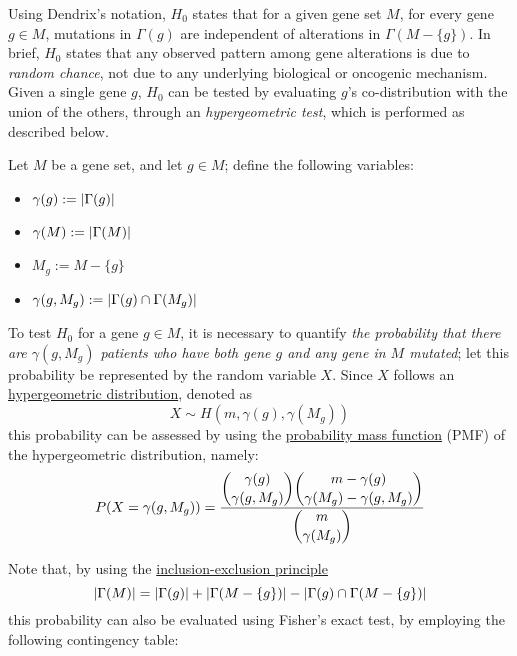 Using Dendrix's notation, $H_0$ states that for a given gene set $M$, for every gene $g \in M$, mutations in $\Gamma(g)$ are independent of alterations in $\Gamma(M - \{g\})$. In brief, $H_0$ states that any observed pattern among gene alterations is due to \textit{random chance}, not due to any underlying biological or oncogenic mechanism. Given a single gene $g$, $H_0$ can be tested by evaluating $g$'s co-distribution with the union of the others, through an \textit{hypergeometric test}, which is performed as described below.

\begin{definition}[Notation]
    Let $M$ be a gene set, and let $g \in M$; define the following variables:

    \begin{itemize}
        \item $\gamma(g) := \left|\Gamma(g)\right|$
        \item $\gamma(M) := \left|\Gamma(M)\right|$
        \item $M_g := M - \{g\}$
        \item $\gamma(g, M_g) := \left|\Gamma(g) \cap \Gamma(M_g)\right|$
    \end{itemize}
\end{definition}

To test $H_0$ for a gene $g \in M$, it is necessary to quantify \textit{the probability that there are $\gamma(g, M_g)$ patients who have both gene $g$ and any gene in $M$ mutated}; let this probability be represented by the random variable $X$. Since $X$ follows an \href{https://en.wikipedia.org/wiki/Hypergeometric_distribution}{hypergeometric distribution}, denoted as $$X \sim H(m, \gamma(g), \gamma(M_g))$$ this probability can be assessed by using the \href{https://en.wikipedia.org/wiki/Probability_mass_function}{probability mass function} (PMF) of the hypergeometric distribution, namely: $$P(X = \gamma(g, M_g)) = \dfrac{\dbinom{\gamma(g)}{\gamma(g, M_g)}\dbinom{m - \gamma(g)}{\gamma(M_g) - \gamma(g, M_g)}}{\dbinom{m}{\gamma(M_g)}}$$

Note that, by using the \href{https://en.wikipedia.org/wiki/Inclusion%E2%80%93exclusion_principle}{inclusion-exclusion principle} $$\left|\Gamma(M)\right| = \left|\Gamma(g)\right| + \left|\Gamma(M - \{g\})\right| - \left|\Gamma(g) \cap \Gamma(M - \{g\})\right|$$ this probability can also be evaluated using Fisher's exact test, by employing the following contingency table:

